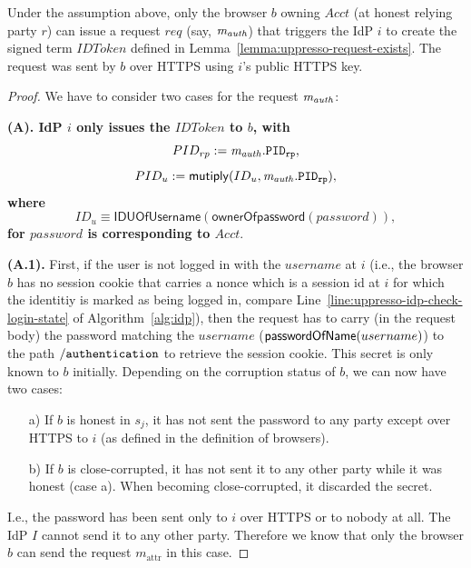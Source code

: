 \begin{theorem}
  \begin{lemma}\label{lemma:b-trigger-request}%
    Under the assumption above, only the browser $b$ owning $Acct$ (at honest relying party $r$) can issue a request $req$ (say, $\mathit{m_{auth}}$) that triggers the IdP $i$ to create the signed term $IDToken$ defined in Lemma~\ref{lemma:uppresso-request-exists}. The request was sent by $b$ over HTTPS using $i$'s public HTTPS key.
  \end{lemma}
  \begin{proof}
    We have to consider two cases for the request $\mathit{m_{auth}}$:
  
    \textbf{(A). IdP $i$ only issues the $IDToken$ to $b$, with
    $$ PID_{rp} := \mathit{m_{auth}.\mathtt{PID_{rp}}}, $$ 
    $$ PID_u := \mathsf{mutiply}(ID_u, \mathit{m_{auth}.\mathtt{PID_{rp}}}), $$ 
    where 
    $$ ID_u \equiv \mathsf{IDUOfUsername} (\mathsf{ownerOfpassword}(password)), $$ 
  for $password$ is corresponding to $Acct$}.
    
    \textbf{(A.1).} First, if the user is not logged in with the    $username$ at $i$ (i.e., the browser $b$ has no session cookie that carries a nonce which is a session id at $i$ for which the identitiy is marked as being logged in, compare Line~\ref{line:uppresso-idp-check-login-state} of Algorithm~\ref{alg:idp}), then the request has to carry (in the request body) the password matching the $username$    ($\mathsf{passwordOfName}(username)$) to the path $\mathtt{/authentication}$ to retrieve the session cookie. This secret is only known to $b$ initially. Depending on the corruption status of $b$, we can now have two cases:
    \begin{enumerate}
    \item[a)] If $b$ is honest in $s_j$, it has not sent the 
      password to any party except over HTTPS to $i$ (as defined 
      in the definition of browsers). 
    \item[b)] If $b$ is close-corrupted, it has not sent it to 
      any other party while it was honest (case a). When 
      becoming close-corrupted, it discarded the secret.
    \end{enumerate}
  
    I.e., the password has been sent only to $i$ over HTTPS or 
    to nobody at all. The IdP $I$ cannot send it to any other 
    party. Therefore we know that only the browser $b$ can send 
    the request $m_\text{attr}$ in this case.
  

\end{proof}
\end{theorem}
